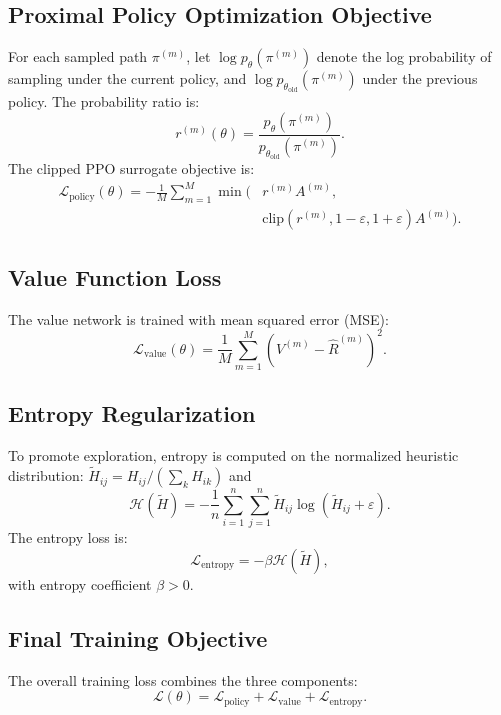 \documentclass[a4paper,conference]{IEEEtran}
\newcommand{\calH}{\mathcal{H}}
\newcommand{\eps}{\varepsilon}
\begin{document}
\subsection{Proximal Policy Optimization Objective}
For each sampled path $\pi^{(m)}$, let $\log p_{\theta}(\pi^{(m)})$ denote the log probability of sampling under the current policy, and $\log p_{\theta_{\text{old}}}(\pi^{(m)})$ under the previous policy. The probability ratio is:
\begin{equation}
r^{(m)}(\theta) = \frac{p_{\theta}(\pi^{(m)})}{p_{\theta_{\text{old}}}(\pi^{(m)})}.
\end{equation}
The clipped PPO surrogate objective is:
\begin{equation}
\begin{aligned}
\mathcal{L}_{\text{policy}}(\theta) = -\frac{1}{M}\sum_{m=1}^M \min\big(&r^{(m)}A^{(m)}, \\
&\text{clip}(r^{(m)},1-\eps,1+\eps)A^{(m)}\big).
\end{aligned}
\end{equation}

\subsection{Value Function Loss}
The value network is trained with mean squared error (MSE):
\begin{equation}
\mathcal{L}_{\text{value}}(\theta) = \frac{1}{M}\sum_{m=1}^M (V^{(m)} - \hat{R}^{(m)})^2.
\end{equation}

\subsection{Entropy Regularization}
To promote exploration, entropy is computed on the normalized heuristic distribution: $\tilde{H}_{ij} = H_{ij} / (\sum_k H_{ik})$ and
\begin{equation}
\calH(\tilde{H}) = -\frac{1}n \sum_{i=1}^n\sum_{j=1}^n \tilde{H}_{ij}\log(\tilde{H}_{ij}+\eps).
\end{equation}
The entropy loss is:
\begin{equation}
\mathcal{L}_{\text{entropy}} = -\beta\calH(\tilde{H}),
\end{equation}
with entropy coefficient $\beta>0$.

\subsection{Final Training Objective}
The overall training loss combines the three components:
\begin{equation}
\mathcal{L}(\theta) = \mathcal{L}_{\text{policy}} + \mathcal{L}_{\text{value}} + \mathcal{L}_{\text{entropy}}.
\end{equation}
\end{document}

